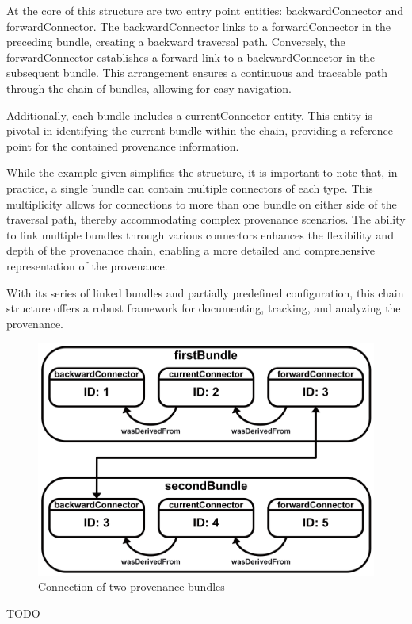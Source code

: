 \documentclass[
  digital,     %
  oneside,     %
  nosansbold,  %
  nocolorbold, %
  lof,         %
  lot,         %
]{fithesis4}
\begin{document}
At the core of this structure are two entry point entities: backwardConnector and forwardConnector. The backwardConnector links to a forwardConnector in the preceding bundle, creating a backward traversal path. Conversely, the forwardConnector establishes a forward link to a backwardConnector in the subsequent bundle. This arrangement ensures a continuous and traceable path through the chain of bundles, allowing for easy navigation.

Additionally, each bundle includes a currentConnector entity. This entity is pivotal in identifying the current bundle within the chain, providing a reference point for the contained provenance information.

While the example given simplifies the structure, it is important to note that, in practice, a single bundle can contain multiple connectors of each type. This multiplicity allows for connections to more than one bundle on either side of the traversal path, thereby accommodating complex provenance scenarios. The ability to link multiple bundles through various connectors enhances the flexibility and depth of the provenance chain, enabling a more detailed and comprehensive representation of the provenance.

With its series of linked bundles and partially predefined configuration, this chain structure offers a robust framework for documenting, tracking, and analyzing the provenance.

\begin{figure}[htbp]
  \begin{center}
    \includegraphics[width=12.5cm]{fithesis/images/bundleconnection.png}
  \end{center}
  \caption{Connection of two provenance bundles}
  \label{fig:bundleconnection}
\end{figure}
\shorthandon{-}
TODO
\end{document}
